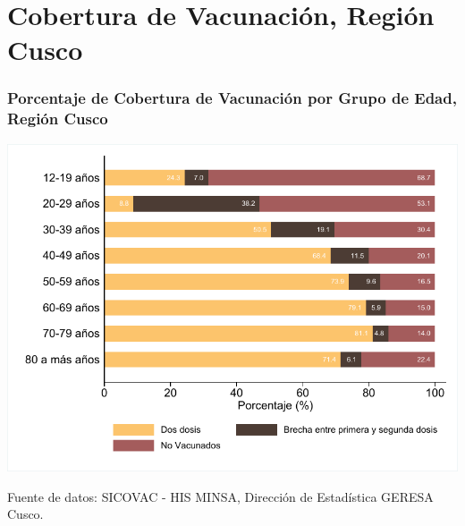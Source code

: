 \documentclass[xcolor=table]{beamer}
\begin{document}

\section{Cobertura de Vacunación, Región Cusco}

\begin{frame}[label=cobertura_vacuna]
	\frametitle{Porcentaje de Cobertura de Vacunación por Grupo de Edad, Región Cusco}
	\vspace{-.5cm}
	\begin{center}
		\includegraphics[width=0.8\linewidth, trim={.2cm .5cm .2cm .2cm},clip]{../figuras/vacunacion_grupo_edad.pdf}
	\end{center}
	{\tiny Fuente de datos: SICOVAC - HIS MINSA, Dirección de Estadística GERESA Cusco.} 
\end{frame}
\end{document}

